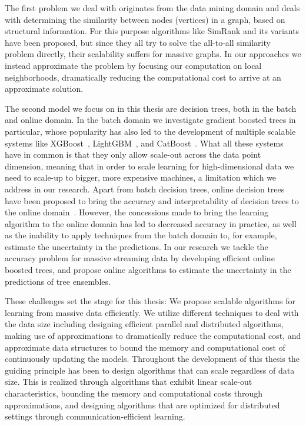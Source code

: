 The first problem we deal with originates
from the data mining domain and deals with determining the
similarity between nodes (vertices) in a graph, based on structural information.
For this purpose algorithms like SimRank and its variants have been
proposed, but since they all try to solve the all-to-all similarity
problem directly, their scalability suffers for massive graphs.
In our approaches we instead approximate the problem by focusing
our computation on local neighborhoods, dramatically reducing the
computational cost to arrive at an approximate solution.

The second model we focus on in this thesis are decision trees,
both in the batch and online domain. In the batch domain we investigate
gradient boosted trees in particular, whose popularity has also led
to the development of multiple scalable systems like XGBoost~\cite{xgboost},
LightGBM~\cite{lightgbm}, and CatBoost~\cite{catboost}. What all these
systems have in common is that they only allow scale-out across
the data point dimension, meaning that in order to scale learning
for high-dimensional data we need to scale-up to bigger, more expensive
machines, a limitation which we address in our research. Apart from
batch decision trees, online decision trees have been proposed
to bring the accuracy and interpretability of decision trees to
the online domain~\cite{vfdt}. However, the concessions made to
bring the learning algorithm to the online domain has led to
decreased accuracy in practice, as well as the inability to apply
techniques from the batch domain to, for example, estimate the uncertainty
in the predictions. In our research we tackle the accuracy problem for
massive streaming data by developing efficient online boosted trees,
and propose online algorithms to estimate the uncertainty in the
predictions of tree ensembles.

These challenges set the stage for this thesis: We propose scalable algorithms
for learning from massive data efficiently. We utilize different techniques
to deal with the data size including designing efficient parallel and distributed
algorithms, making use of approximations to dramatically reduce the computational
cost, and approximate data structures to bound the memory and computational cost
of continuously updating the models. Throughout the development of this thesis the guiding
principle has been to design algorithms that can scale regardless of data size.
This is realized through algorithms that exhibit linear scale-out characteristics,
bounding the memory and computational costs through approximations, and designing
algorithms that are optimized for distributed settings through communication-efficient
learning.


